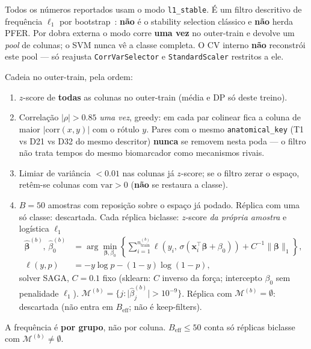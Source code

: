 \documentclass[review]{elsarticle}
\newcommand{\code}[1]{\texttt{#1}}
\begin{document}
Todos os números reportados usam o modo \code{l1\_stable}.
É um filtro descritivo de frequência $\ell_1$ por bootstrap~\cite{bach-2008,meinshausen-2010}: \textbf{não} é o stability selection clássico e \textbf{não} herda PFER.
Por dobra externa o modo corre \textbf{uma vez} no outer-train e devolve um \emph{pool} de colunas; o SVM nunca vê a classe completa.
O CV interno \textbf{não} reconstrói este pool --- só reajusta \code{CorrVarSelector} e \code{StandardScaler} restritos a ele.

Cadeia no outer-train, pela ordem:
\begin{enumerate}
\item $z$-score de \textbf{todas} as colunas no outer-train (média e DP só deste treino).
\item Correlação $|\rho|>0.85$ \emph{uma vez}, greedy: em cada par colinear fica a coluna de maior $|\mathrm{corr}(x,y)|$ com o rótulo $y$.
Pares com o mesmo \code{anatomical\_key} (T1 vs D21 vs D32 do mesmo descritor) \textbf{nunca} se removem nesta poda --- o filtro não trata tempos do mesmo biomarcador como mecanismos rivais.
\item Limiar de variância $<0.01$ nas colunas já $z$-score; se o filtro zerar o espaço, retêm-se colunas com $\mathrm{var}>0$ (\textbf{não} se restaura a classe).
\item $B=50$ amostras com reposição sobre o espaço já podado.
Réplica com uma só classe: descartada.
Cada réplica biclasse: $z$-score \emph{da própria amostra} e logística $\ell_1$
\begin{equation}
\begin{aligned}
\hat{\boldsymbol{\beta}}^{(b)},\,\hat{\beta}_0^{(b)}
&= \arg\min_{\boldsymbol{\beta},\beta_0}
\left\{
\sum_{i=1}^{n_{\mathrm{train}}^{(b)}}
\ell\!\left(y_i,\,\sigma(\mathbf{x}_i^{\top}\boldsymbol{\beta}+\beta_0)\right)
+ C^{-1}\|\boldsymbol{\beta}\|_1
\right\}, \\
\ell(y,p) &= -y\log p-(1-y)\log(1-p),
\end{aligned}
\label{eq:l1-logistic}
\end{equation}
solver SAGA, $C=0.1$ fixo (sklearn: $C$ inverso da força; intercepto $\beta_0$ sem penalidade $\ell_1$).
$\mathcal{M}^{(b)}=\{j:\lvert\hat{\beta}^{(b)}_j\rvert>10^{-9}\}$.
Réplica com $\mathcal{M}^{(b)}=\emptyset$: descartada (não entra em $B_{\mathrm{eff}}$; não é keep-filters).
\end{enumerate}
A frequência é \textbf{por grupo}, não por coluna.
$B_{\mathrm{eff}}\le 50$ conta só réplicas biclasse com $\mathcal{M}^{(b)}\ne\emptyset$.
\end{document}
